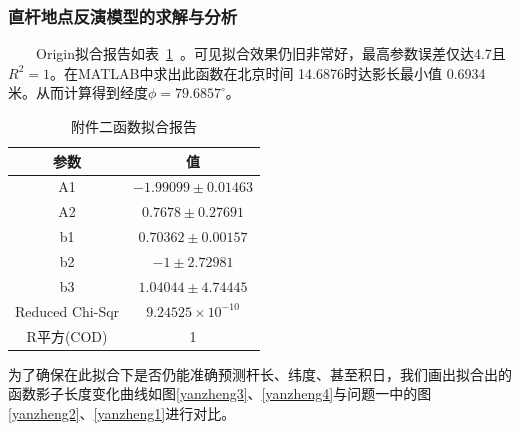 \documentclass[12pt]{cumcmart}   %
\begin{document}
\subsubsection{直杆地点反演模型的求解与分析}
$\qquad$Origin拟合报告如表~\ref{baogao2}~。可见拟合效果仍旧非常好，最高参数误差仅达4.7且$R^2=1$。在MATLAB中求出此函数在北京时间 14.6876时达影长最小值 0.6934米。从而计算得到经度$\phi=79.6857^\circ$。
\begin{table}[!htbp]
	\centering
	\caption{附件二函数拟合报告}\label{baogao2}
	\begin{tabular}{cc}
		\toprule[1.5pt]
		参数& 值 \\
		\midrule[1pt]
		A1	&$-1.99099 \pm 0.01463$\\
		A2	&$	0.7678 \pm 0.27691$\\
		b1	&$0.70362\pm 0.00157$\\
		b2  &$-1 \pm2.72981$\\
     	b3  &$1.04044 \pm 4.74445$\\
		Reduced Chi-Sqr &$9.24525\times10^{-10}$\\
		R平方(COD)&	1\\
		\bottomrule[1.5pt]
	\end{tabular}
\end{table}
为了确保在此拟合下是否仍能准确预测杆长、纬度、甚至积日，我们画出拟合出的函数影子长度变化曲线如图\ref{yanzheng3}、\ref{yanzheng4}与问题一中的图\ref{yanzheng2}、\ref{yanzheng1}进行对比。
\end{document}
